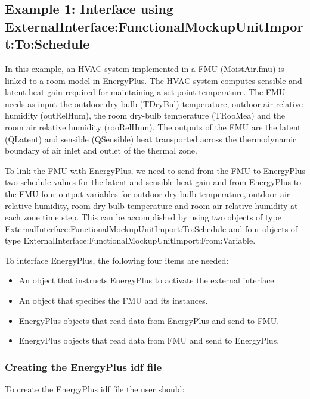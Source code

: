 \subsection{Example 1: Interface using ExternalInterface:FunctionalMockupUnitImport:To:Schedule}\label{example-1-interface-using-externalinterfacefunctionalmockupunitimporttoschedule}

In this example, an HVAC system implemented in a FMU (MoistAir.fmu) is linked to a room model in EnergyPlus. The HVAC system computes sensible and latent heat gain required for maintaining a set point temperature. The FMU needs as input the outdoor dry-bulb (TDryBul) temperature, outdoor air relative humidity (outRelHum), the room dry-bulb temperature (TRooMea) and the room air relative humidity (rooRelHum). The outputs of the FMU are the latent (QLatent) and sensible (QSensible) heat transported across the thermodynamic boundary of air inlet and outlet of the thermal zone.

To link the FMU with EnergyPlus, we need to send from the FMU to EnergyPlus two schedule values for the latent and sensible heat gain and from EnergyPlus to the FMU four output variables for outdoor dry-bulb temperature, outdoor air relative humidity, room dry-bulb temperature and room air relative humidity at each zone time step. This can be accomplished by using two objects of type ExternalInterface:FunctionalMockupUnitImport:To:Schedule and four objects of type ExternalInterface:FunctionalMockupUnitImport:From:Variable.

To interface EnergyPlus, the following four items are needed:

\begin{itemize}
\item
  An object that instructs EnergyPlus to activate the external interface.
\item
  An object that specifies the FMU and its instances.
\item
  EnergyPlus objects that read data from EnergyPlus and send to FMU.
\item
  EnergyPlus objects that read data from FMU and send to EnergyPlus.
\end{itemize}

\subsubsection{Creating the EnergyPlus idf file}\label{creating-the-energyplus-idf-file-000}

To create the EnergyPlus idf file the user should:

